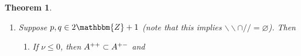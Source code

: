 \documentclass[12pt]{msjproc} %
\newcommand{\assign}{:=}
\newcommand{\tmop}[1]{\ensuremath{\operatorname{#1}}}
\newtheorem{theorem}{Theorem}
\theoremstyle{definition}
\theoremstyle{exampstyle} \newtheorem{examp}[theorem]{Theorem}
\begin{document}
\begin{versiona}
\begin{theorem}
\begin{enumerate}
\begin{enumerate}
      \begin{center}
        \begin{center}
          \begin{tabular}{|c|c|c|}
            \hline
            & $\nu \in 2\mathbbm{Z}$ & $\nu \in 2\mathbbm{Z}+ 1$\\
            \hline
            $(/ / \cup \backslash\backslash)^c$ & $\tmop{full}$ & $A^{+ -}$\\
            \hline
            $/ / \cap \backslash\backslash, k < l$ & $\tmop{full}$ &
            $\varnothing$\\
            \hline
            $/ / -\backslash\backslash$ & $\tmop{full}$ & $\varnothing$\\
            \hline
          \end{tabular}
        \end{center}
      \end{center}
      
      \item If $\nu > (p + q + 1) - 4$, then $A^{+ -} \cap A^{- +} =
      \varnothing$ and for $A^{- -} \assign \{ (a, b) \in \mathcal{I} | a + b
      \geqslant \nu - n + 3 \}$
      
      \begin{center}
        \begin{center}
          \begin{center}
            \begin{center}
              \begin{tabular}{|c|c|c|}
                \hline
                & $\nu \in 2\mathbbm{Z}$ & $\nu \in 2\mathbbm{Z}+ 1$\\
                \hline
                $(/ / \cup \backslash\backslash)^c$ & $\tmop{full}$ & $A^{+
                -}$\\
                \hline
                $/ / \cap \backslash\backslash, k < l$ & $A^{- -}$ &
                $\varnothing$\\
                \hline
                $/ / -\backslash\backslash$ & $\tmop{full}$ & $\varnothing$\\
                \hline
              \end{tabular}
            \end{center}
          \end{center}
          
          \ 
        \end{center}
      \end{center}
    \end{enumerate}
    \item Suppose $p, q \in 2\mathbbm{Z}+ 1$ (note that this implies
    $\backslash\backslash \cap / / = \varnothing$). Then
    \begin{enumerate}
      \item If $\nu \leqslant 0$, then $A^{ + +} \subset A^{+ -}$ and
      

\end{enumerate}
\end{enumerate}
\end{theorem}
\end{versiona}
\end{document}
